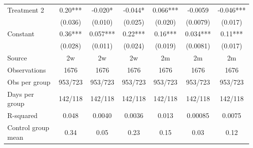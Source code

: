 \begin{tabular}{lcccccc}
Treatment 2 & 0.20*** & -0.020* & -0.044* & 0.066*** & -0.0059 & -0.046*** \\
      & (0.036) & (0.010) & (0.025) & (0.020) & (0.0079) & (0.017) \\
Constant & 0.36*** & 0.057*** & 0.22*** & 0.16*** & 0.034*** & 0.11*** \\
      & (0.028) & (0.011) & (0.024) & (0.019) & (0.0081) & (0.017) \\
\midrule
Source & 2w    & 2w    & 2w    & 2m    & 2m    & 2m \\
Observations & 1676  & 1676  & 1676  & 1676  & 1676  & 1676 \\
Obs per group & 953/723 & 953/723 & 953/723 & 953/723 & 953/723 & 953/723 \\
Days per group & 142/118 & 142/118 & 142/118 & 142/118 & 142/118 & 142/118 \\
R-squared & 0.048 & 0.0040 & 0.0036 & 0.013 & 0.00085 & 0.0075 \\
Control group mean & 0.34  & 0.05  & 0.23  & 0.15  & 0.03  & 0.12 \\
\bottomrule
\bottomrule
\end{tabular}%
